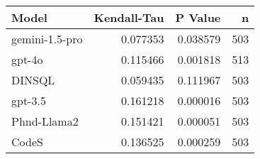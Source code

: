 \begin{tabular}{lrrr}
\toprule
Model & Kendall-Tau & P Value & n \\
\midrule
gemini-1.5-pro & 0.077353 & 0.038579 & 503 \\
gpt-4o & 0.115466 & 0.001818 & 513 \\
DINSQL & 0.059435 & 0.111967 & 503 \\
gpt-3.5 & 0.161218 & 0.000016 & 503 \\
Phnd-Llama2 & 0.151421 & 0.000051 & 503 \\
CodeS & 0.136525 & 0.000259 & 503 \\
\bottomrule
\end{tabular}
